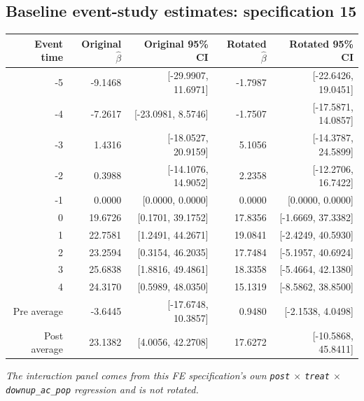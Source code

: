 \documentclass[10pt]{article}
\begin{document}
\subsection*{Baseline event-study estimates: specification 15}
\begin{center}
\scriptsize
\begin{tabular}{r rr rr}
\toprule
Event time & Original $\hat\beta$ & Original 95\% CI & Rotated $\hat\beta$ & Rotated 95\% CI \\
\midrule
-5 & -9.1468 & [-29.9907, 11.6971] & -1.7987 & [-22.6426, 19.0451] \\
-4 & -7.2617 & [-23.0981, 8.5746] & -1.7507 & [-17.5871, 14.0857] \\
-3 & 1.4316 & [-18.0527, 20.9159] & 5.1056 & [-14.3787, 24.5899] \\
-2 & 0.3988 & [-14.1076, 14.9052] & 2.2358 & [-12.2706, 16.7422] \\
-1 & 0.0000 & [0.0000, 0.0000] & 0.0000 & [0.0000, 0.0000] \\
0 & 19.6726 & [0.1701, 39.1752] & 17.8356 & [-1.6669, 37.3382] \\
1 & 22.7581 & [1.2491, 44.2671] & 19.0841 & [-2.4249, 40.5930] \\
2 & 23.2594 & [0.3154, 46.2035] & 17.7484 & [-5.1957, 40.6924] \\
3 & 25.6838 & [1.8816, 49.4861] & 18.3358 & [-5.4664, 42.1380] \\
4 & 24.3170 & [0.5989, 48.0350] & 15.1319 & [-8.5862, 38.8500] \\
\midrule
Pre average & -3.6445 & [-17.6748, 10.3857] & 0.9480 & [-2.1538, 4.0498] \\
Post average & 23.1382 & [4.0056, 42.2708] & 17.6272 & [-10.5868, 45.8411] \\
\bottomrule
\end{tabular}
\end{center}
\medskip
\textit{The interaction panel comes from this FE specification's own \texttt{post} $\times$ \texttt{treat} $\times$ \texttt{downup\_ac\_pop} regression and is not rotated.}
\clearpage
\end{document}
